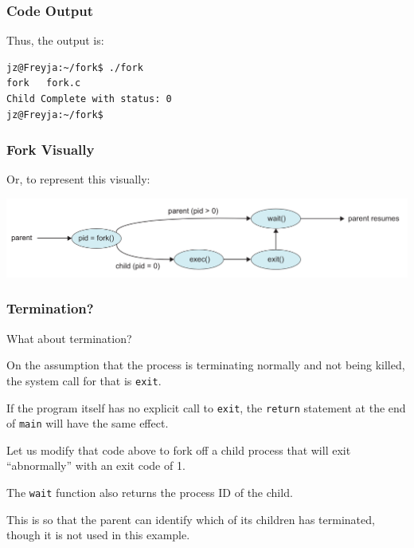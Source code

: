 \begin{frame}[fragile]
\frametitle{Code Output}

Thus, the output is:
\begin{verbatim}
jz@Freyja:~/fork$ ./fork 
fork   fork.c
Child Complete with status: 0
jz@Freyja:~/fork$ 
\end{verbatim}


\end{frame}

\begin{frame}
\frametitle{Fork Visually}

Or, to represent this visually:

\begin{center}
\includegraphics[width=\textwidth]{images/fork-syscall.png}
\end{center}

\end{frame}

\begin{frame}
\frametitle{Termination?}

What about termination? 

On the assumption that the process is terminating normally and not being killed, the system call for that is \texttt{exit}. 

If the program itself has no explicit call to \texttt{exit}, the \texttt{return} statement at the end of \texttt{main} will have the same effect.

Let us modify that code above to fork off a child process that will exit ``abnormally'' with an exit code of 1. 

The \texttt{wait} function also returns the process ID of the child.

 This is so that the parent can identify which of its children has terminated, though it is not used in this example.

\end{frame}


